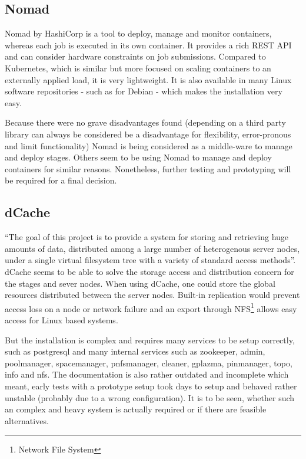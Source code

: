 \subsection{Nomad}
\label{nomad}

Nomad\cite{nomad:main} by HashiCorp is a tool to deploy, manage and monitor containers, whereas each job is executed in its own container.
It provides a rich REST API and can consider hardware constraints on job submissions.
Compared to Kubernetes\cite{nomad:vs:kubernetes}, which is similar but more focused on scaling containers to an externally applied load, it is very lightweight.
It is also available in many Linux software repositories - such as for Debian - which makes the installation very easy.

Because there were no grave disadvantages found (depending on a third party library can always be considered be a disadvantage for flexibility, error-pronous and limit functionality) Nomad is being considered as a middle-ware to manage and deploy stages.
Others\cite{nomad:etc:gui_thesis} seem to be using Nomad to manage and deploy containers for similar reasons.
Nonetheless, further testing and prototyping will be required for a final decision.

\subsection{dCache}
\label{dcache}

\enquote{The goal of this project is to provide a system for storing and retrieving huge amounts of data, distributed among a large number of heterogenous server nodes, under a single virtual filesystem tree with a variety of standard access methods}\cite{dcache:main}.
dCache seems to be able to solve the storage access and distribution concern for the stages and sever nodes.
When using dCache, one could store the global resources distributed between the server nodes.
Built-in replication would prevent access loss on a node or network failure and an export through NFS\footnote{Network File System} allows easy access for Linux based systems\cite{dcache:overview:whitepaper}.

But the installation is complex and requires many services to be setup correctly, such as postgresql and many internal services such as zookeeper, admin, poolmanager, spacemanager, pnfsmanager, cleaner, gplazma, pinmanager, topo, info and nfs.
The documentation is also rather outdated and incomplete which meant, early tests with a prototype setup took days to setup and behaved rather unstable (probably due to a wrong configuration).
It is to be seen, whether such an complex and heavy system is actually required or if there are feasible alternatives.




